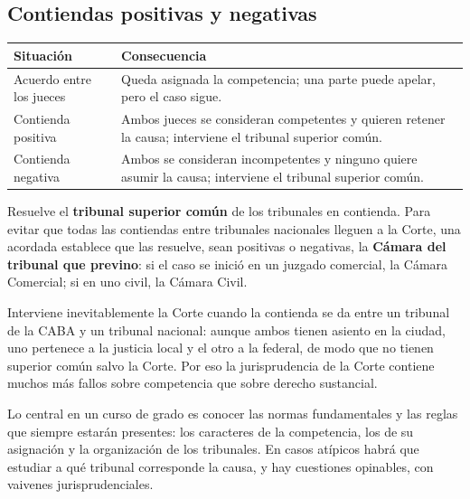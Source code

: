 \documentclass[12pt,oneside]{book}
\renewcommand{\arraystretch}{1.15}
\begin{document}
\subsection{Contiendas positivas y negativas}

\begin{table}[H]
\centering
\renewcommand{\arraystretch}{1.3}
\begin{tabularx}{\textwidth}{>{\RaggedRight\arraybackslash}p{}>{\RaggedRight\arraybackslash}X}
\toprule
\textbf{Situación} & \textbf{Consecuencia} \\
\midrule
Acuerdo entre los jueces & Queda asignada la competencia; una parte puede apelar, pero el caso sigue. \\
\addlinespace
Contienda positiva & Ambos jueces se consideran competentes y quieren retener la causa; interviene el tribunal superior común. \\
\addlinespace
Contienda negativa & Ambos se consideran incompetentes y ninguno quiere asumir la causa; interviene el tribunal superior común. \\
\bottomrule
\end{tabularx}
\end{table}

Resuelve el \textbf{tribunal superior común} de los tribunales en contienda. Para evitar que todas las contiendas entre tribunales nacionales lleguen a la Corte, una acordada establece que las resuelve, sean positivas o negativas, la \textbf{Cámara del tribunal que previno}: si el caso se inició en un juzgado comercial, la Cámara Comercial; si en uno civil, la Cámara Civil.

Interviene inevitablemente la Corte cuando la contienda se da entre un tribunal de la CABA y un tribunal nacional: aunque ambos tienen asiento en la ciudad, uno pertenece a la justicia local y el otro a la federal, de modo que no tienen superior común salvo la Corte. Por eso la jurisprudencia de la Corte contiene muchos más fallos sobre competencia que sobre derecho sustancial.

\begin{important}
Lo central en un curso de grado es conocer las normas fundamentales y las reglas que siempre estarán presentes: los caracteres de la competencia, los de su asignación y la organización de los tribunales. En casos atípicos habrá que estudiar a qué tribunal corresponde la causa, y hay cuestiones opinables, con vaivenes jurisprudenciales.
\end{important}
\end{document}
